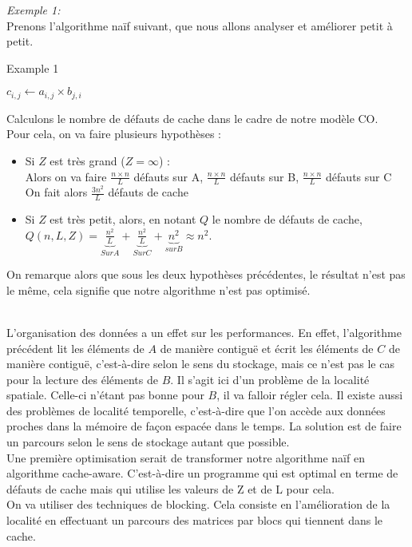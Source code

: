 \documentclass[
  paper=a4,
  ,captions=tableheading
]{scrartcl}
\begin{document}
\emph{Exemple 1:}\\
Prenons l'algorithme naïf suivant, que nous allons analyser et améliorer
petit à petit.

\begin{algorithm}[H]
\caption{Example 1}
\begin{algorithmic}[1]
\Statex
 
      \State $c_{i,j} \gets a_{i,j} \times b_{j,i}$
    \EndFor
  \EndFor
\end{algorithmic}
\end{algorithm}

Calculons le nombre de défauts de cache dans le cadre de notre modèle
CO.\\
Pour cela, on va faire plusieurs hypothèses :

\begin{itemize}
\item
  Si \(Z\) est très grand (\(Z = \infty\)) :\\
  Alors on va faire \(\frac{n \times n}{L}\) défauts sur A,
  \(\frac{n \times n}{L}\) défauts sur B, \(\frac{n \times n}{L}\)
  défauts sur C\\
  On fait alors \(\frac{3n^2}{L}\) défauts de cache
\item
  Si \(Z\) est très petit, alors, en notant \(Q\) le nombre de défauts
  de cache,\\
  \(Q(n, L, Z) = \underbrace{ \frac{n^2}{L}}_{Sur A} + \underbrace{\frac{n^2}{L}}_{Sur C} + \underbrace{n^2}_{sur B} \approx n^2\).
\end{itemize}

On remarque alors que sous les deux hypothèses précédentes, le résultat
n'est pas le même, cela signifie que notre algorithme n'est pas
optimisé.

~\\
L'organisation des données a un effet sur les performances. En effet,
l'algorithme précédent lit les éléments de \(A\) de manière contiguë et
écrit les éléments de \(C\) de manière contiguë, c'est-à-dire selon le
sens du stockage, mais ce n'est pas le cas pour la lecture des éléments
de \(B\). Il s'agit ici d'un problème de la localité spatiale. Celle-ci
n'étant pas bonne pour \(B\), il va falloir régler cela. Il existe aussi
des problèmes de localité temporelle, c'est-à-dire que l'on accède aux
données proches dans la mémoire de façon espacée dans le temps. La
solution est de faire un parcours selon le sens de stockage autant que
possible.\\
Une première optimisation serait de transformer notre algorithme naïf en
algorithme cache-aware. C'est-à-dire un programme qui est optimal en
terme de défauts de cache mais qui utilise les valeurs de Z et de L pour
cela.\\
On va utiliser des techniques de blocking. Cela consiste en
l'amélioration de la localité en effectuant un parcours des matrices par
blocs qui tiennent dans le cache.
\end{document}
